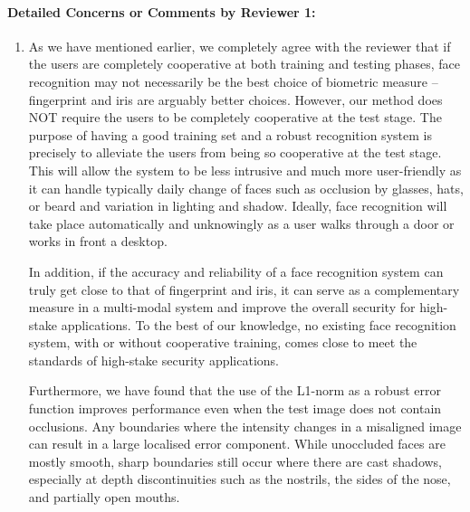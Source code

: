 \documentclass[11pt]{article}
\begin{document}
\paragraph{Detailed Concerns or Comments by Reviewer 1:}
\begin{enumerate}
\item As we have mentioned earlier, we completely agree with the reviewer that if the users are completely cooperative at
both training and testing phases, face recognition may not necessarily be the best choice of biometric measure -- fingerprint
and iris are arguably better choices. However, our method does NOT require the users to be completely cooperative at the test stage. The purpose of having a good training set and a robust recognition system is precisely to alleviate the users 
from being so cooperative at the test stage. This will allow the system to be less intrusive and much more user-friendly 
as it can handle typically daily change of faces such as occlusion by glasses, hats, or beard and variation in lighting and shadow. Ideally, face recognition will take place automatically and unknowingly as a user walks through a door or works in front a desktop.

In addition, if the accuracy and reliability of a face recognition system can truly get close to that of fingerprint and iris, it can serve as a complementary measure in a multi-modal system and improve the overall security for high-stake applications. To the best of our knowledge, no existing face recognition system, with or without cooperative training, comes close to meet the standards of high-stake security applications. 

Furthermore, we have found that the use of the L1-norm as a robust error function improves performance 
even when the test image does not contain occlusions.  Any boundaries where the intensity changes in a
misaligned image can result in a large localised error component.  While
unoccluded faces are mostly smooth, sharp boundaries still occur where there
are cast shadows, especially at depth discontinuities such as the nostrils, the
sides of the nose, and partially open mouths.  



\end{enumerate}
\end{document}
